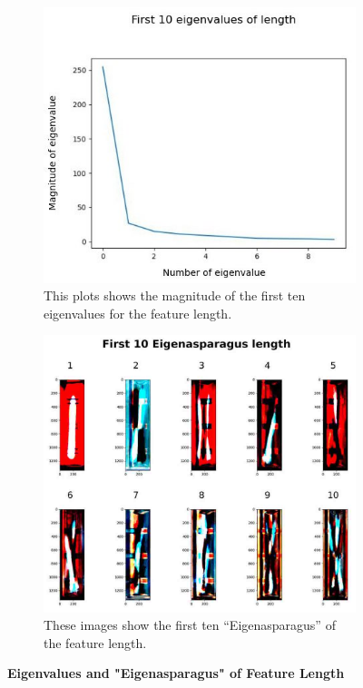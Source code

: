 \begin{figure}[H]
	\centering
	\begin{subfigure}{0.7\textwidth}
		\includegraphics[width=0.9\linewidth]{Figures/chapter04/pca_length_graph.png} 
		\caption{This plots shows the magnitude of the first ten eigenvalues for the feature length.}
	\end{subfigure}
	\vspace{20pt}
	
	\begin{subfigure}{0.9\textwidth}
		\includegraphics[width=0.9\linewidth]{Figures/chapter04/pca_length.png}
		\caption{These images show the first ten “Eigenasparagus” of the feature length.}
	\end{subfigure}
	\caption[First ten Eigenvalues and "Eigenasparagus" of Feature Length]{\textbf{Eigenvalues and "Eigenasparagus" of Feature Length}}
    \label{fig:PCAlength}
\end{figure}

